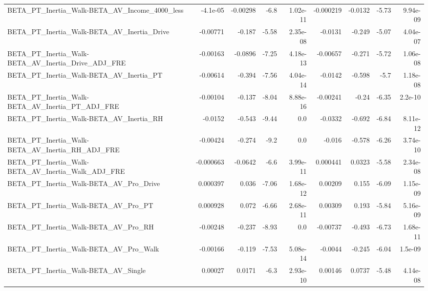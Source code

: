 \begin{tabular}{lrrrrrrrr}
BETA\_PT\_Inertia\_Walk-BETA\_AV\_Income\_4000\_less      &    -4.1e-05 &     -0.00298 &     -6.8 & 1.02e-11 &  -0.000219 &     -0.0132 &        -5.73 &      9.94e-09 \\
BETA\_PT\_Inertia\_Walk-BETA\_AV\_Inertia\_Drive         &    -0.00771 &       -0.187 &    -5.58 & 2.35e-08 &    -0.0131 &      -0.249 &        -5.07 &      4.04e-07 \\
BETA\_PT\_Inertia\_Walk-BETA\_AV\_Inertia\_Drive\_ADJ\_FRE &    -0.00163 &      -0.0896 &    -7.25 & 4.18e-13 &   -0.00657 &      -0.271 &        -5.72 &      1.06e-08 \\
BETA\_PT\_Inertia\_Walk-BETA\_AV\_Inertia\_PT            &    -0.00614 &       -0.394 &    -7.56 & 4.04e-14 &    -0.0142 &      -0.598 &         -5.7 &      1.18e-08 \\
BETA\_PT\_Inertia\_Walk-BETA\_AV\_Inertia\_PT\_ADJ\_FRE    &    -0.00104 &       -0.137 &    -8.04 & 8.88e-16 &   -0.00241 &       -0.24 &        -6.35 &       2.2e-10 \\
BETA\_PT\_Inertia\_Walk-BETA\_AV\_Inertia\_RH            &     -0.0152 &       -0.543 &    -9.44 &      0.0 &    -0.0332 &      -0.692 &        -6.84 &      8.11e-12 \\
BETA\_PT\_Inertia\_Walk-BETA\_AV\_Inertia\_RH\_ADJ\_FRE    &    -0.00424 &       -0.274 &     -9.2 &      0.0 &     -0.016 &      -0.578 &        -6.26 &      3.74e-10 \\
BETA\_PT\_Inertia\_Walk-BETA\_AV\_Inertia\_Walk\_ADJ\_FRE  &   -0.000663 &      -0.0642 &     -6.6 & 3.99e-11 &   0.000441 &      0.0323 &        -5.58 &      2.34e-08 \\
BETA\_PT\_Inertia\_Walk-BETA\_AV\_Pro\_Drive             &    0.000397 &        0.036 &    -7.06 & 1.68e-12 &    0.00209 &       0.155 &        -6.09 &      1.15e-09 \\
BETA\_PT\_Inertia\_Walk-BETA\_AV\_Pro\_PT                &    0.000928 &        0.072 &    -6.66 & 2.68e-11 &    0.00309 &       0.193 &        -5.84 &      5.16e-09 \\
BETA\_PT\_Inertia\_Walk-BETA\_AV\_Pro\_RH                &    -0.00248 &       -0.237 &    -8.93 &      0.0 &   -0.00737 &      -0.493 &        -6.73 &      1.68e-11 \\
BETA\_PT\_Inertia\_Walk-BETA\_AV\_Pro\_Walk              &    -0.00166 &       -0.119 &    -7.53 & 5.08e-14 &    -0.0044 &      -0.245 &        -6.04 &       1.5e-09 \\
BETA\_PT\_Inertia\_Walk-BETA\_AV\_Single                &     0.00027 &       0.0171 &     -6.3 & 2.93e-10 &    0.00146 &      0.0737 &        -5.48 &      4.14e-08 \\

\end{tabular}
